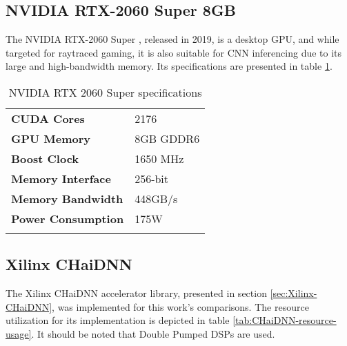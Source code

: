 
\subsection{NVIDIA RTX-2060 Super 8GB}
The NVIDIA RTX-2060 Super \cite{NVIDIA-RTX-2060-Super}, released in 2019, is a desktop GPU, and while targeted for raytraced gaming, it is also suitable for CNN inferencing due to its large and high-bandwidth memory. Its specifications are presented in table \ref{tab:NVIDIA-RTX-2060-Super-specs}.

\begin{table}[H]
	\caption{NVIDIA RTX 2060 Super specifications}
	\label{tab:NVIDIA-RTX-2060-Super-specs}
	\centering
	\begin{tabular}{ll}
		\toprule
		\textbf{CUDA Cores} & 2176\\
		\textbf{GPU Memory} & 8GB GDDR6\\
		\textbf{Boost Clock} & 1650 MHz\\
		\textbf{Memory Interface} & 256-bit\\
		\textbf{Memory Bandwidth} & 448GB/s\\
		\textbf{Power Consumption} & 175W\\
		\bottomrule\\
	\end{tabular}
\end{table}

\subsection{Xilinx CHaiDNN}
The Xilinx CHaiDNN accelerator library, presented in section \ref{sec:Xilinx-CHaiDNN}, was implemented for this work's comparisons. The resource utilization for its implementation is depicted in table \ref{tab:CHaiDNN-resource-usage}. It should be noted that Double Pumped DSPs are used.

